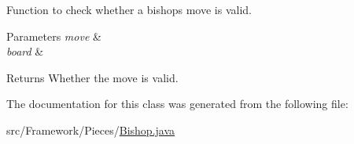 Function to check whether a bishop\textquotesingle{}s move is valid. 
\begin{DoxyParams}{Parameters}
{\em move} & \\
\hline
{\em board} & \\
\hline
\end{DoxyParams}
\begin{DoxyReturn}{Returns}
Whether the move is valid. 
\end{DoxyReturn}


The documentation for this class was generated from the following file\+:\begin{DoxyCompactItemize}
\item 
src/\+Framework/\+Pieces/\hyperlink{_bishop_8java}{Bishop.\+java}\end{DoxyCompactItemize}
